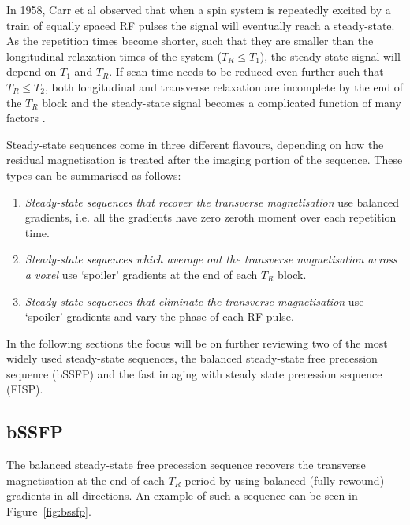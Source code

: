 \hfill

In 1958, Carr et al \cite{Carr1958} observed that when a spin system is repeatedly excited by a train of equally spaced RF pulses the signal will eventually reach a steady-state.
As the repetition times become shorter, such that they are smaller than the longitudinal relaxation times of the system ($T_R \leq T_1$), the steady-state signal will depend on $T_1$ and $T_R$.
If scan time needs to be reduced even further such that $T_R \leq T_2$, both longitudinal and transverse relaxation are incomplete by the end of the $T_R$ block and the steady-state signal becomes a complicated function of many factors \cite{Hargreaves2012}.

\hfill

Steady-state sequences come in three different flavours, depending on how the residual magnetisation is treated after the imaging portion of the sequence.
These types can be summarised as follows:
\begin{enumerate}
    \item \textit{Steady-state sequences that recover the transverse magnetisation} use balanced gradients, i.e. all the gradients have zero zeroth moment over each repetition time.
    
    \item \textit{Steady-state sequences which average out the transverse magnetisation across a voxel} use `spoiler' gradients at the end of each $T_R$ block.
    
    \item \textit{Steady-state sequences that eliminate the transverse magnetisation} use `spoiler' gradients and vary the phase of each RF pulse.
\end{enumerate}

In the following sections the focus will be on further reviewing two of the most widely used steady-state sequences, the balanced steady-state free precession sequence (bSSFP) and the fast imaging with steady state precession sequence (FISP).

\hfill

\subsection{bSSFP}
\label{MRIBSSFP}

The balanced steady-state free precession sequence recovers the transverse magnetisation at the end of each $T_R$ period by using balanced (fully rewound) gradients in all directions.
An example of such a sequence can be seen in Figure~\ref{fig:bssfp}.

